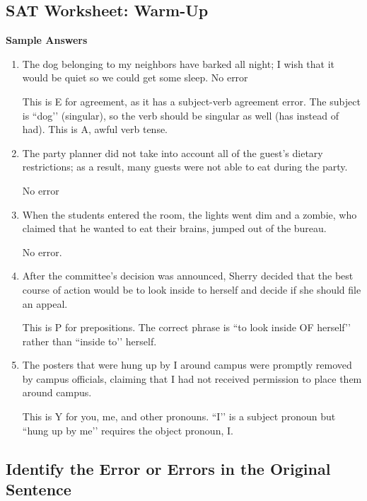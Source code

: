 \subsection{SAT Worksheet: Warm-Up}

\textbf{Sample Answers}

\begin{enumerate}

\item The dog belonging to my neighbors have barked all night; I wish that it would be quiet so we could get some sleep. No error

\bigskip
This is E for agreement, as it has a subject-verb agreement error. The subject is ``dog’’ (singular), so the verb should be singular as well (has instead of had). This is A, awful verb tense. 

\item The party planner did not take into account all of the guest’s dietary restrictions; as a result, many guests were not able to eat during the party. 

\bigskip
No error

\item When the students entered the room, the lights went dim and a zombie, who claimed that he wanted to eat their brains, jumped out of the bureau. 

\bigskip
No error.  

\item After the committee’s decision was announced, Sherry decided that the best course of action would be to look inside to herself and decide if she should file an appeal. 

\bigskip
This is P for prepositions. The correct phrase is ``to look inside OF herself’’ rather than ``inside to’’ herself. 

\item The posters that were hung up by I around campus were promptly removed by campus officials, claiming that I had not received permission to place them around campus. 

\bigskip
This is Y for you, me, and other pronouns. ``I’’ is a subject pronoun but ``hung up by me’’ requires the object pronoun, I. 

\end{enumerate}

\subsection{Identify the Error or Errors in the Original Sentence}

